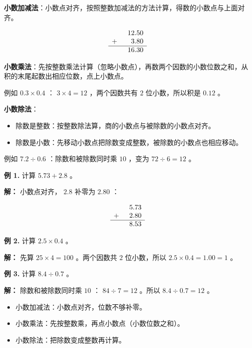 \begin{understand}


\textbf{小数加减法}：小数点对齐，按照整数加减法的方法计算，得数的小数点与上面对齐。

\[
\begin{array}{rl}
&12.50 \\
+\enspace&\phantom{0}3.80 \\
\hline
&16.30
\end{array}
\]


\textbf{小数乘法}：先按整数乘法计算（忽略小数点），再数两个因数的小数位数之和，从积的末尾起数出相应位数，点上小数点。

例如 $0.3 \times 0.4$ ： $3 \times 4 = 12$ ，两个因数共有 $2$ 位小数，所以积是 $0.12$ 。

\textbf{小数除法}：
\begin{itemize}
  \item 除数是整数：按整数除法算，商的小数点与被除数的小数点对齐。
  \item 除数是小数：先移动小数点把除数变成整数，被除数的小数点也相应移动。
\end{itemize}


例如 $7.2 \div 0.6$ ：除数和被除数同时乘 $10$ ，变为 $72 \div 6 = 12$ 。

\end{understand}

\begin{workedexamples}


\textbf{例 1.} 计算 $5.73 + 2.8$ 。

\textbf{解：} 小数点对齐， $2.8$ 补零为 $2.80$ ：

\[
\begin{array}{rl}
&5.73 \\
+\enspace&2.80 \\
\hline
&8.53
\end{array}
\]


\textbf{例 2.} 计算 $2.5 \times 0.4$ 。

\textbf{解：} 先算 $25 \times 4 = 100$ 。两个因数共 $2$ 位小数，所以 $2.5 \times 0.4 = 1.00 = 1$ 。

\textbf{例 3.} 计算 $8.4 \div 0.7$ 。

\textbf{解：} 除数和被除数同时乘 $10$ ： $84 \div 7 = 12$ 。所以 $8.4 \div 0.7 = 12$ 。

\end{workedexamples}

\begin{keytakeaway}


\begin{itemize}
  \item 小数加减法：小数点对齐，位数不够补零。
  \item 小数乘法：先按整数乘，再点小数点（小数位数之和）。
  \item 小数除法：把除数变成整数再计算。
\end{itemize}


\end{keytakeaway}

